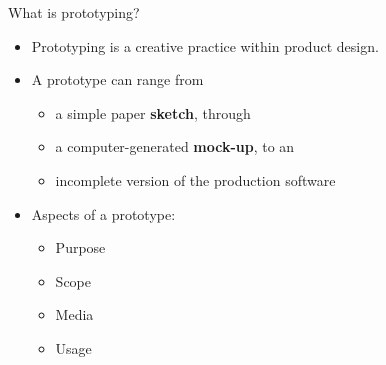 \begin{Slide}{What is prototyping?}
\begin{itemize}
\item Prototyping is a creative practice within product design.
\item A prototype can range from 
\begin{itemize}
\item a simple paper \textbf{sketch}, through 
\item a computer-generated \textbf{mock-up}, to an 
\item incomplete version of the production software
\end{itemize}
\item Aspects of a prototype:
\begin{itemize}
\item Purpose 
\item Scope 
\item Media 
\item Usage 

\end{itemize}
\end{itemize}
\end{Slide}